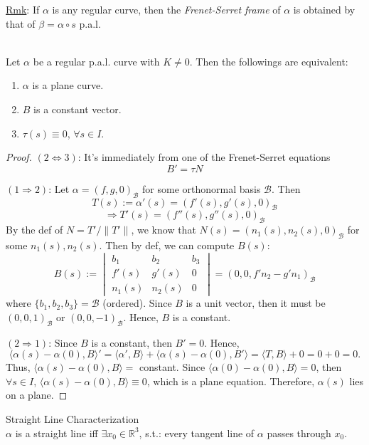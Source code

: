 \noindent\underline{Rmk}: If $\alpha$ is any regular curve, then the \textit{Frenet-Serret frame} of $\alpha$ is obtained by that of $\beta = \alpha\circ s$ p.a.l.

\\
Let $\alpha$ be a regular p.a.l. curve with $K\neq 0$. Then the followings are equivalent:
\begin{enumerate}
\item $\alpha$ is a plane curve.
\item $B$ is a constant vector.
\item $\tau(s)\equiv 0$, $\forall s\in I$.
\end{enumerate}

\begin{proof}
$(2\Leftrightarrow 3)$: It's immediately from one of the Frenet-Serret equations
\[
B' = \tau N
\]

\noindent $(1\Rightarrow 2)$: Let $\alpha = (f, g, 0)_{\mathcal{B}}$ for some orthonormal basis $\mathcal{B}$. Then
\[
T(s) := \alpha'(s) = (f'(s), g'(s), 0)_{\mathcal{B}}
\]
\[
\Rightarrow T'(s) = (f''(s), g''(s), 0)_{\mathcal{B}}
\]
By the def of $N = T'\big/\|T'\|$, we know that $N(s) = (n_1(s), n_2(s), 0)_{\mathcal{B}}$ for some $n_1(s), n_2(s)$. Then by def, we can compute $B(s)$:
\[
B(s) := \begin{vmatrix} b_1 & b_2 & b_3\\ f'(s) & g'(s) & 0\\ n_1(s) & n_2(s) & 0 \end{vmatrix} = (0, 0, f'n_2 - g'n_1)_{\mathcal{B}}
\]
where $\{b_1, b_2, b_3\} = \mathcal{B}$ (ordered). Since $B$ is a unit vector, then it must be $(0,0,1)_{\mathcal{B}}$ or $(0,0,-1)_{\mathcal{B}}$. Hence, $B$ is a constant.

\noindent $(2\Rightarrow 1)$: Since $B$ is a constant, then $B' = 0$. Hence,
\[
\langle\alpha(s) - \alpha(0), B\rangle' = \langle\alpha', B\rangle + \langle\alpha(s) - \alpha(0), B'\rangle = \langle T, B\rangle + 0 = 0 + 0 = 0.
\]
Thus, $\langle\alpha(s) - \alpha(0), B\rangle = $ constant. Since $\langle\alpha(0) - \alpha(0), B\rangle = 0$, then $\forall s\in I$, $\langle\alpha(s) - \alpha(0), B\rangle\equiv 0$, which is a plane equation. Therefore, $\alpha(s)$ lies on a plane.
\end{proof}

\begin{proposition}{Straight Line Characterization}\\
$\alpha$ is a straight line iff $\exists x_0\in\mathbb{R}^3$, s.t.: every tangent line of $\alpha$ passes through $x_0$.
\end{proposition}

